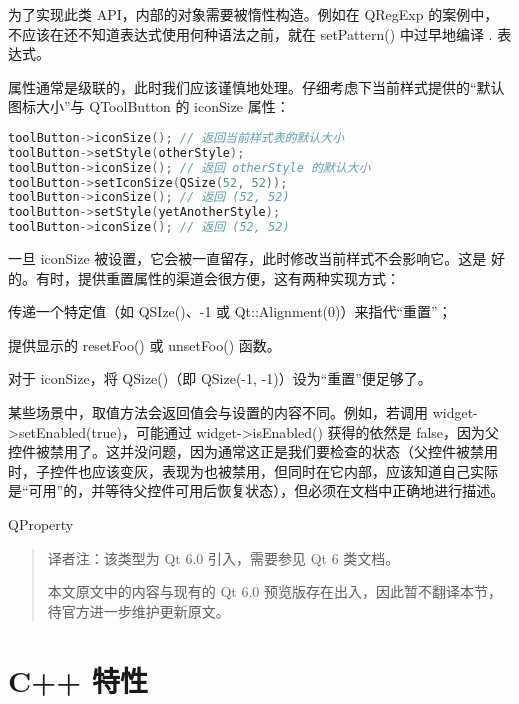 为了实现此类 API，内部的对象需要被惰性构造。例如在 QRegExp 的案例中，不应该在还不知道表达式使用何种语法之前，就在 setPattern() 中过早地编译 . 表达式。

属性通常是级联的，此时我们应该谨慎地处理。仔细考虑下当前样式提供的“默认图标大小”与 QToolButton 的 iconSize 属性：

\begin{lstlisting}[language=C++]
toolButton->iconSize(); // 返回当前样式表的默认大小
toolButton->setStyle(otherStyle);
toolButton->iconSize(); // 返回 otherStyle 的默认大小
toolButton->setIconSize(QSize(52, 52));
toolButton->iconSize(); // 返回 (52, 52)
toolButton->setStyle(yetAnotherStyle);
toolButton->iconSize(); // 返回 (52, 52) 
\end{lstlisting}

\begin{notice}
	一旦 iconSize 被设置，它会被一直留存，此时修改当前样式不会影响它。这是 好的。有时，提供重置属性的渠道会很方便，这有两种实现方式：

\end{notice}

\begin{compactitem}
	\item 传递一个特定值（如 QSIze()、-1 或 Qt::Alignment(0)）来指代“重置”；
	\item 提供显示的 resetFoo() 或 unsetFoo() 函数。
\end{compactitem}

对于 iconSize，将 QSize()（即 QSize(-1, -1)）设为“重置”便足够了。

某些场景中，取值方法会返回值会与设置的内容不同。例如，若调用 widget->setEnabled(true)，可能通过 widget->isEnabled() 获得的依然是 false，因为父控件被禁用了。这并没问题，因为通常这正是我们要检查的状态（父控件被禁用时，子控件也应该变灰，表现为也被禁用，但同时在它内部，应该知道自己实际是“可用”的，并等待父控件可用后恢复状态），但必须在文档中正确地进行描述。

QProperty

\begin{quote}
译者注：该类型为 Qt 6.0 引入，需要参见 Qt 6 类文档。

本文原文中的内容与现有的 Qt 6.0 预览版存在出入，因此暂不翻译本节，待官方进一步维护更新原文。
\end{quote}

\section{C++ 特性}

